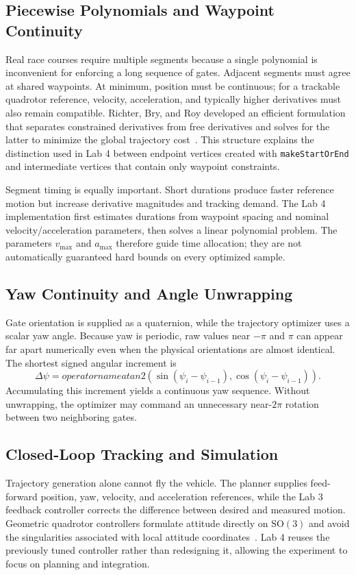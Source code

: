\documentclass[letterpaper,10pt,conference]{IEEEtran}
\begin{document}
\subsection{Piecewise Polynomials and Waypoint Continuity}
Real race courses require multiple segments because a single polynomial is inconvenient for enforcing a long sequence of gates. Adjacent segments must agree at shared waypoints. At minimum, position must be continuous; for a trackable quadrotor reference, velocity, acceleration, and typically higher derivatives must also remain compatible. Richter, Bry, and Roy developed an efficient formulation that separates constrained derivatives from free derivatives and solves for the latter to minimize the global trajectory cost~\cite{richter2016}. This structure explains the distinction used in Lab 4 between endpoint vertices created with \texttt{makeStartOrEnd} and intermediate vertices that contain only waypoint constraints.

Segment timing is equally important. Short durations produce faster reference motion but increase derivative magnitudes and tracking demand. The Lab 4 implementation first estimates durations from waypoint spacing and nominal velocity/acceleration parameters, then solves a linear polynomial problem. The parameters $v_{\max}$ and $a_{\max}$ therefore guide time allocation; they are not automatically guaranteed hard bounds on every optimized sample.

\subsection{Yaw Continuity and Angle Unwrapping}
Gate orientation is supplied as a quaternion, while the trajectory optimizer uses a scalar yaw angle. Because yaw is periodic, raw values near $-\pi$ and $\pi$ can appear far apart numerically even when the physical orientations are almost identical. The shortest signed angular increment is
\begin{equation}
\Delta\psi=operatorname{atan2}(\sin(\psi_i-\psi_{i-1}),
\cos(\psi_i-\psi_{i-1})).
\end{equation}
Accumulating this increment yields a continuous yaw sequence. Without unwrapping, the optimizer may command an unnecessary near-$2\pi$ rotation between two neighboring gates.

\subsection{Closed-Loop Tracking and Simulation}
Trajectory generation alone cannot fly the vehicle. The planner supplies feed-forward position, yaw, velocity, and acceleration references, while the Lab 3 feedback controller corrects the difference between desired and measured motion. Geometric quadrotor controllers formulate attitude directly on $\mathrm{SO}(3)$ and avoid the singularities associated with local attitude coordinates~\cite{lee2010}. Lab 4 reuses the previously tuned controller rather than redesigning it, allowing the experiment to focus on planning and integration.
\end{document}

